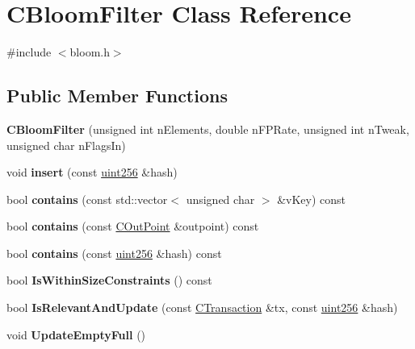 \hypertarget{class_c_bloom_filter}{}\section{C\+Bloom\+Filter Class Reference}
\label{class_c_bloom_filter}


{\ttfamily \#include $<$bloom.\+h$>$}

\subsection*{Public Member Functions}
\begin{DoxyCompactItemize}
\item 
\mbox{\label{class_c_bloom_filter_a6395cfcb278ed9cf4ae873549c996f83}} 
{\bfseries C\+Bloom\+Filter} (unsigned int n\+Elements, double n\+F\+P\+Rate, unsigned int n\+Tweak, unsigned char n\+Flags\+In)
\item 
\mbox{\label{class_c_bloom_filter_ac86479ac4ac157a7f0188baaa93202cb}} 
void {\bfseries insert} (const \mbox{\hyperlink{classuint256}{uint256}} \&hash)
\item 
\mbox{\label{class_c_bloom_filter_afe62e10a4c4cf64e18a2a659d0bcc31b}} 
bool {\bfseries contains} (const std\+::vector$<$ unsigned char $>$ \&v\+Key) const
\item 
\mbox{\label{class_c_bloom_filter_af4557c3253f218eaf13e6d7da53e20e9}} 
bool {\bfseries contains} (const \mbox{\hyperlink{class_c_out_point}{C\+Out\+Point}} \&outpoint) const
\item 
\mbox{\label{class_c_bloom_filter_a4c26810781cdc0fd34443f32612ac83b}} 
bool {\bfseries contains} (const \mbox{\hyperlink{classuint256}{uint256}} \&hash) const
\item 
\mbox{\label{class_c_bloom_filter_a06f2094da8e7d9c6ad4ea426858e32de}} 
bool {\bfseries Is\+Within\+Size\+Constraints} () const
\item 
\mbox{\label{class_c_bloom_filter_a544848eeef17b19bf51fbfe9b5f2d87e}} 
bool {\bfseries Is\+Relevant\+And\+Update} (const \mbox{\hyperlink{class_c_transaction}{C\+Transaction}} \&tx, const \mbox{\hyperlink{classuint256}{uint256}} \&hash)
\item 
\mbox{\label{class_c_bloom_filter_af98b43e91c82a1e4afc7454e8c5672c2}} 
void {\bfseries Update\+Empty\+Full} ()
\end{DoxyCompactItemize}


